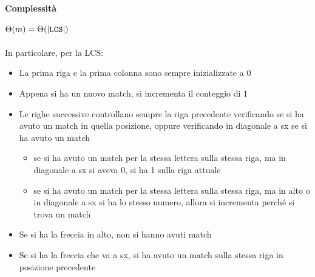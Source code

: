 \paragraph{Complessità} $\Theta(m) = \Theta(|\verb|LCS||)$ \\~\\
In particolare, per la LCS:
\begin{itemize}
    \item La prima riga e la prima colonna sono sempre inizializzate a $0$
    \item Appena si ha un nuovo match, si incrementa il conteggio di $1$
    \item Le righe successive controllano sempre la riga precedente verificando se si ha avuto un match in quella posizione, oppure verificando in diagonale a sx se si ha avuto un match
    \begin{itemize}
        \item se si ha avuto un match per la stessa lettera sulla stessa riga, ma in diagonale a sx si aveva 0, si ha 1 sulla riga attuale
        \item se si ha avuto un match per la stessa lettera sulla stessa riga, ma in alto o in diagonale a sx si ha lo stesso numero, allora si incrementa perché si trova un match
    \end{itemize}
    \item Se si ha la freccia in alto, non si hanno avuti match
    \item Se si ha la freccia che va a sx, si ha avuto un match sulla stessa riga in posizione precedente
\end{itemize}

